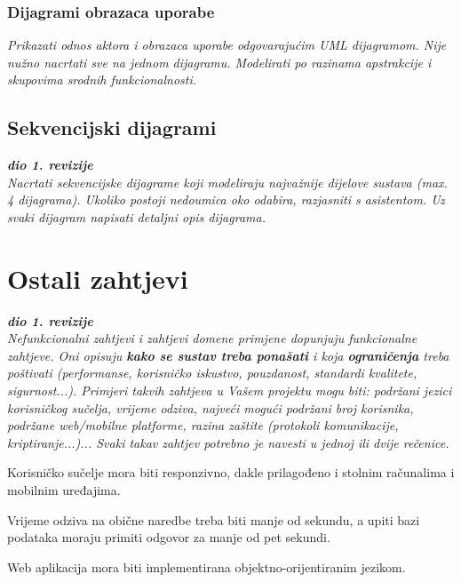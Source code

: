 				\subsubsection{Dijagrami obrazaca uporabe}
					
					\textit{Prikazati odnos aktora i obrazaca uporabe odgovarajućim UML dijagramom. Nije nužno nacrtati sve na jednom dijagramu. Modelirati po razinama apstrakcije i skupovima srodnih funkcionalnosti.}
				\eject		
				
			\subsection{Sekvencijski dijagrami}
				
				\textbf{\textit{dio 1. revizije}}\\
				
				\textit{Nacrtati sekvencijske dijagrame koji modeliraju najvažnije dijelove sustava (max. 4 dijagrama). Ukoliko postoji nedoumica oko odabira, razjasniti s asistentom. Uz svaki dijagram napisati detaljni opis dijagrama.}
				\eject
	
		\section{Ostali zahtjevi}
		
			\textbf{\textit{dio 1. revizije}}\\
		 
			 \textit{Nefunkcionalni zahtjevi i zahtjevi domene primjene dopunjuju funkcionalne zahtjeve. Oni opisuju \textbf{kako se sustav treba ponašati} i koja \textbf{ograničenja} treba poštivati (performanse, korisničko iskustvo, pouzdanost, standardi kvalitete, sigurnost...). Primjeri takvih zahtjeva u Vašem projektu mogu biti: podržani jezici korisničkog sučelja, vrijeme odziva, najveći mogući podržani broj korisnika, podržane web/mobilne platforme, razina zaštite (protokoli komunikacije, kriptiranje...)... Svaki takav zahtjev potrebno je navesti u jednoj ili dvije rečenice.}
			 
			 Korisničko sučelje mora biti responzivno, dakle prilagođeno i stolnim računalima i mobilnim uređajima.
			 
			 Vrijeme odziva na obične naredbe treba biti manje od sekundu, a upiti bazi podataka moraju primiti odgovor za manje od pet sekundi.
			 
			 Web aplikacija mora biti implementirana objektno-orijentiranim jezikom.
			 
			 
